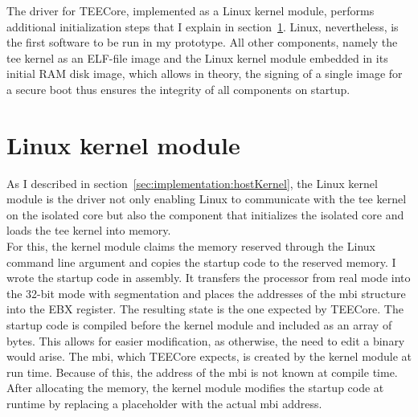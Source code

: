 The driver for TEECore, implemented as a Linux kernel module, performs
additional initialization steps that I explain in
section~\ref{sec:implementation:kmod}. Linux, nevertheless, is the first
software to be run in my prototype. All other components, namely the \gls{tee}
kernel as an ELF-file image and the Linux kernel module embedded in its initial
RAM disk image, which allows in theory, the signing of a single image for a
secure boot thus ensures the integrity of all components on startup.\\

\section{Linux kernel module}
\label{sec:implementation:kmod}
As I described in section~\ref{sec:implementation:hostKernel}, the Linux kernel
module is the driver not only enabling Linux to communicate with the \gls{tee}
kernel on the isolated core but also the component that initializes the isolated
core and loads the \gls{tee} kernel into memory.\\

For this, the kernel module claims the memory reserved through the Linux command
line argument and copies the startup code to the reserved memory. I wrote the
startup code in assembly. It transfers the processor from real mode into the
32-bit mode with segmentation and places the addresses of the \gls{mbi}
structure into the EBX register. The resulting state is the one expected by
TEECore. The startup code is compiled before the kernel module and included as
an array of bytes. This allows for easier modification, as otherwise, the need
to edit a binary would arise. The \gls{mbi}, which TEECore expects, is created
by the kernel module at run time. Because of this, the address of the \gls{mbi}
is not known at compile time. After allocating the memory, the kernel module
modifies the startup code at runtime by replacing a placeholder with the actual
\gls{mbi} address.\\

